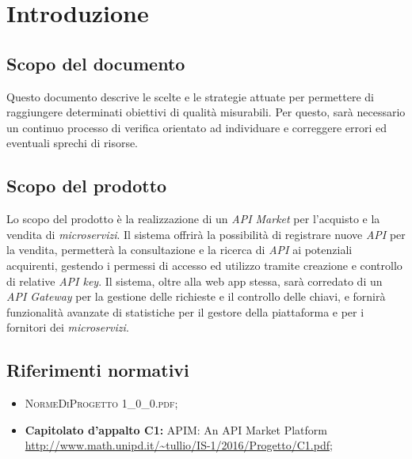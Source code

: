 \newpage
\section{Introduzione}

\subsection{Scopo del documento}
Questo documento descrive le scelte e le strategie attuate per permettere di raggiungere determinati obiettivi di qualità misurabili. Per questo, sarà necessario un continuo processo di verifica orientato ad individuare e correggere errori ed eventuali sprechi di risorse.

\subsection{Scopo del prodotto}
Lo scopo del prodotto è la realizzazione di un \textit{API Market} per l'acquisto e la vendita di \textit{microservizi}. Il sistema offrirà la possibilità di registrare nuove \textit{API} per la vendita, permetterà la consultazione e la ricerca di \textit{API} ai potenziali acquirenti, gestendo i permessi di accesso ed utilizzo tramite creazione e controllo di relative \textit{API key}. Il sistema, oltre alla web app stessa, sarà corredato di un \textit{API Gateway} per la gestione delle richieste e il controllo delle chiavi, e fornirà funzionalità avanzate di statistiche per il gestore della piattaforma e per i fornitori dei \textit{microservizi}.

\subsection{Riferimenti normativi}
\begin{itemize}
\item \textsc{NormeDiProgetto 1\_0\_0.pdf};
\item \textbf{Capitolato d’appalto C1:} APIM: An API Market Platform\\ \url{http://www.math.unipd.it/~tullio/IS-1/2016/Progetto/C1.pdf};
\end{itemize}

